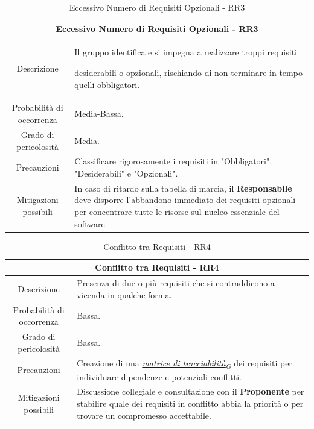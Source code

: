 \documentclass[12pt, a4paper]{article}
\newcommand{\urlglossario}{https://skynetunigroup.github.io/Code_Guardian/Documentazione/PB/glossario_v2.0.0.pdf} %
\newcommand{\glo}[2]{\href{\urlglossario\#nameddest=#2}{#1\textsubscript{G}}}
\begin{document}
{\begin{table}[H]
    \centering
    \renewcommand{\arraystretch}{1.3}
    \begin{tabularx}{\textwidth}{|c|X|}
        \hline
        \multicolumn{2}{|c|}{\textbf{Eccessivo Numero di Requisiti Opzionali - RR3}} \\ \hline
        Descrizione & 
        Il gruppo identifica e si impegna a realizzare troppi requisiti
 
        desiderabili o opzionali, rischiando di non terminare in tempo quelli
        obbligatori.
\\ \hline
        Probabilità di occorrenza & Media-Bassa.
\\ \hline
        Grado di pericolosità & Media.
\\ \hline
        Precauzioni & 
        Classificare rigorosamente i requisiti in "Obbligatori", "Desiderabili"
        e "Opzionali".
\\ \hline
        Mitigazioni possibili &
        In caso di ritardo sulla tabella di marcia, il \textbf{Responsabile} deve
        disporre l'abbandono immediato dei requisiti opzionali
        per concentrare tutte le risorse sul nucleo essenziale del software.\\ \hline
    \end{tabularx}
    \caption{Eccessivo Numero di Requisiti Opzionali - RR3}
\end{table}

\begin{table}[H]
    \centering
    \renewcommand{\arraystretch}{1.3}
    \begin{tabularx}{\textwidth}{|c|X|}
        \hline
     
        \multicolumn{2}{|c|}{\textbf{Conflitto tra Requisiti - RR4}} \\ \hline
        Descrizione &
        Presenza di due o più requisiti che si contraddicono a vicenda in
        qualche forma.
\\ \hline
        Probabilità di occorrenza & Bassa.
\\ \hline
        Grado di pericolosità & Bassa.
\\ \hline
        Precauzioni &
        Creazione di una \textit{\glo{matrice di tracciabilità}{matrice-di-tracciabilita}} dei requisiti per individuare
        dipendenze e potenziali conflitti.
\\ \hline
        Mitigazioni possibili &
        Discussione collegiale e consultazione con il \textbf{Proponente} per stabilire
        quale dei requisiti in conflitto abbia la priorità o per trovare un
        compromesso accettabile.
\\ \hline
    \end{tabularx}
    \caption{Conflitto tra Requisiti - RR4}
\end{table}

}
\end{document}
